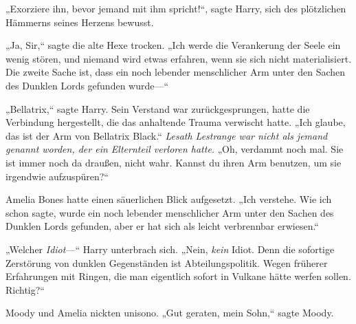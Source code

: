 „Exorziere ihn, bevor jemand mit ihm spricht!“, sagte Harry, sich des plötzlichen Hämmerns seines Herzens bewusst.

„Ja, Sir,“ sagte die alte Hexe trocken. „Ich werde die Verankerung der Seele ein wenig stören, und niemand wird etwas erfahren, wenn sie sich nicht materialisiert. Die zweite Sache ist, dass ein noch lebender menschlicher Arm unter den Sachen des Dunklen Lords gefunden wurde—“

„Bellatrix,“ sagte Harry.
Sein Verstand war zurückgesprungen, hatte die Verbindung hergestellt, die das anhaltende Trauma verwischt hatte.
„Ich glaube, das ist der Arm von Bellatrix Black.“
\emph{Lesath Lestrange war nicht als jemand genannt worden, der ein Elternteil verloren hatte.}
„Oh, verdammt noch mal. Sie ist immer noch da draußen, nicht wahr. Kannst du ihren Arm benutzen, um sie irgendwie aufzuspüren?“

Amelia Bones hatte einen säuerlichen Blick aufgesetzt.
„Ich verstehe. Wie ich schon sagte, wurde ein noch lebender menschlicher Arm unter den Sachen des Dunklen Lords gefunden, aber er hat sich als leicht verbrennbar erwiesen.“

„Welcher \emph{Idiot}—“
Harry unterbrach sich.
„Nein, \emph{kein} Idiot. Denn die sofortige Zerstörung von dunklen Gegenständen ist Abteilungspolitik. Wegen früherer Erfahrungen mit Ringen, die man eigentlich sofort in Vulkane hätte werfen sollen. Richtig?“

Moody und Amelia nickten unisono.
„Gut geraten, mein Sohn,“ sagte Moody.

